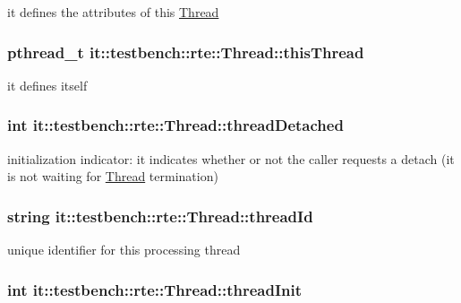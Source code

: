 it defines the attributes of this \hyperlink{classit_1_1testbench_1_1rte_1_1Thread}{Thread} \hypertarget{classit_1_1testbench_1_1rte_1_1Thread_a461aaef7afe799a65616727b58b069d8}{
\subsubsection[{this\-Thread}]{\setlength{\rightskip}{0pt plus 5cm}pthread\-\_\-t it\-::testbench\-::rte\-::\-Thread\-::this\-Thread\hspace{0.3cm}{\ttfamily [protected]}}}\label{df/df6/classit_1_1testbench_1_1rte_1_1Thread_a461aaef7afe799a65616727b58b069d8}
it defines itself \hypertarget{classit_1_1testbench_1_1rte_1_1Thread_a5ef7815e90cae33d623e09160bf65ade}{
\subsubsection[{thread\-Detached}]{\setlength{\rightskip}{0pt plus 5cm}int it\-::testbench\-::rte\-::\-Thread\-::thread\-Detached\hspace{0.3cm}{\ttfamily [protected]}}}\label{df/df6/classit_1_1testbench_1_1rte_1_1Thread_a5ef7815e90cae33d623e09160bf65ade}
initialization indicator\-: it indicates whether or not the caller requests a detach (it is not waiting for \hyperlink{classit_1_1testbench_1_1rte_1_1Thread}{Thread} termination) \hypertarget{classit_1_1testbench_1_1rte_1_1Thread_a5c9db3a81df5fc51a3987e4a3ca6aace}{
\subsubsection[{thread\-Id}]{\setlength{\rightskip}{0pt plus 5cm}string it\-::testbench\-::rte\-::\-Thread\-::thread\-Id\hspace{0.3cm}{\ttfamily [protected]}}}\label{df/df6/classit_1_1testbench_1_1rte_1_1Thread_a5c9db3a81df5fc51a3987e4a3ca6aace}
unique identifier for this processing thread \hypertarget{classit_1_1testbench_1_1rte_1_1Thread_ada467f1ac1ac01c62c245bce9ac379fd}{
\subsubsection[{thread\-Init}]{\setlength{\rightskip}{0pt plus 5cm}int it\-::testbench\-::rte\-::\-Thread\-::thread\-Init\hspace{0.3cm}{\ttfamily [protected]}}}\label{df/df6/classit_1_1testbench_1_1rte_1_1Thread_ada467f1ac1ac01c62c245bce9ac379fd}
